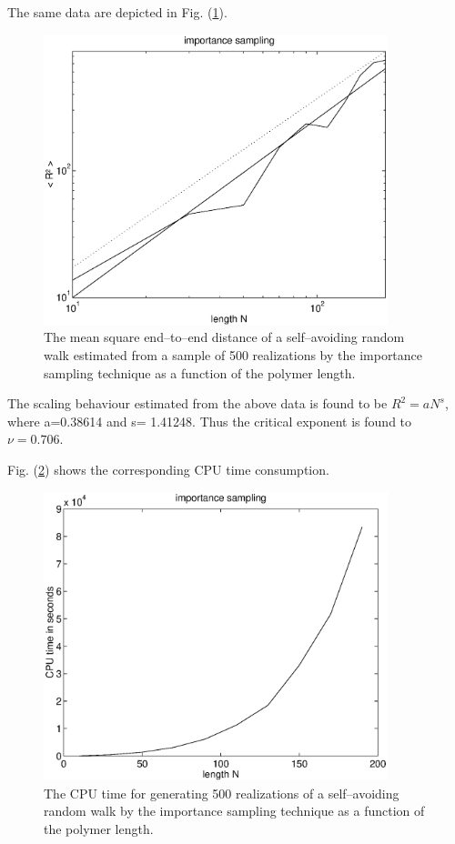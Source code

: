 The same data are depicted in Fig. (\ref{F_PLOTSAWLONG1}).
\begin{figure}
\label{F_PLOTSAWLONG1}
\includegraphics[width=10cm]{./Figures/f_plotsawlong1.eps}
\caption{The mean square end--to--end distance of a 
self--avoiding random walk estimated from a sample of 500
realizations by the importance sampling
technique as a function of the polymer length.}
\end{figure}
The scaling behaviour estimated from the above data is found to be
$R^2=aN^s$, where a=0.38614 and s= 1.41248. Thus the critical 
exponent is found to $\nu = 0.706$.

Fig. (\ref{F_PLOTSAWLONG2}) shows the corresponding CPU time 
consumption.
\begin{figure}
\label{F_PLOTSAWLONG2}
\includegraphics[width=10cm]{./Figures/f_plotsawlong2.eps}
\caption{The CPU time for generating 500 realizations  of a 
self--avoiding random walk  by the importance sampling
technique as a function of the polymer length.}
\end{figure}


